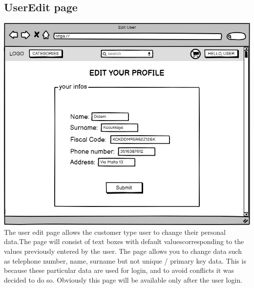 \subsection{UserEdit page}
    \includegraphics[width=\textwidth,height=\textheight,keepaspectratio]{mockups/userEditPageMockup.png}
\\
The user edit page allows the customer type user to change their personal data.The page will consist of text boxes with default values ​​corresponding to the values ​​previously entered by the user. The page allows you to change data such as telephone number, name, surname but not unique / primary key data. This is because these particular data are used for login, and to avoid conflicts it was decided to do so.
Obviously this page will be available only after the user login.

